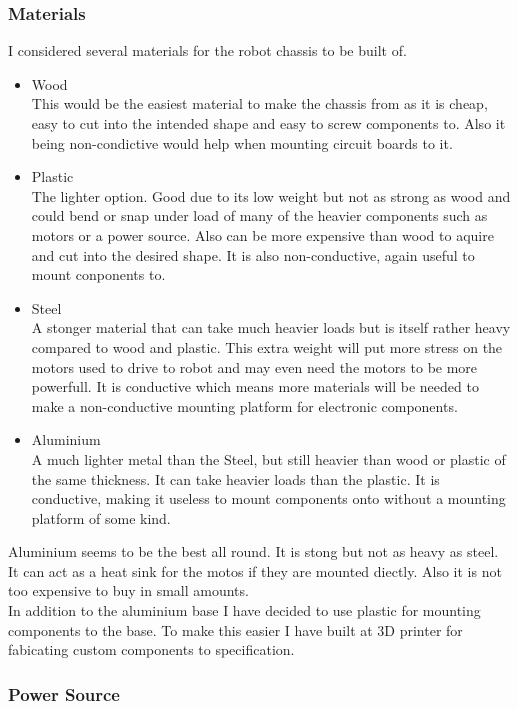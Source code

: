 \documentclass[11pt,fleqn,twoside]{article}
\begin{document}
\subsubsection{Materials}
I considered several materials for the robot chassis to be built of.
\begin{itemize}
\item Wood
\\This would be the easiest material to make the chassis from as it is cheap, easy to cut into the intended shape and easy to screw components to.  Also it being non-condictive would help when mounting circuit boards to it.
\item Plastic
\\The lighter option.  Good due to its low weight but not as strong as wood and could bend or snap under load of many of the heavier components such as motors or a power source.  Also can be more expensive than wood to aquire and cut into the desired shape.  It is also non-conductive, again useful to mount conponents to.
\item Steel
\\A stonger material that can take much heavier loads but is itself rather heavy compared to wood and plastic.  This extra weight will put more stress on the motors used to drive to robot and may even need the motors to be more powerfull.  It is conductive which means more materials will be needed to make a non-conductive mounting platform for electronic components.
\item Aluminium
\\A much lighter metal than the Steel, but still heavier than wood or plastic of the same thickness.  It can take heavier loads than the plastic. It is conductive, making it useless to mount components onto without a mounting platform of some kind.
\end{itemize}
Aluminium seems to be the best all round.  It is stong but not as heavy as steel.  It can act as a heat sink for the motos if they are mounted diectly.  Also it is not too expensive to buy in small amounts.
\\In addition to the aluminium base I have decided to use plastic for mounting components to the base.  To make this easier I have built at 3D printer for fabicating custom components to specification.

\subsubsection{Power Source}
\end{document}
